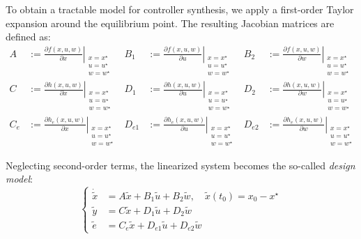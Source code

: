 \documentclass[]{report}
\begin{document}
	
	To obtain a tractable model for controller synthesis, we apply a first-order Taylor expansion around the equilibrium point. The resulting Jacobian matrices are defined as:
	\begin{equation}
		\label{eq:jacobians_compact_matrix}
		\begin{aligned}
			A &:= \left. \frac{\partial f(x, u, w)}{\partial x} \right|_{\substack{x = x^\star \\ u = u^\star \\ w = w^\star}} & B_1 &:= \left. \frac{\partial f(x, u, w)}{\partial u} \right|_{\substack{x = x^\star \\ u = u^\star \\ w = w^\star}} & B_2 &:= \left. \frac{\partial f(x, u, w)}{\partial w} \right|_{\substack{x = x^\star \\ u = u^\star \\ w = w^\star}} \\
			C &:= \left. \frac{\partial h(x, u, w)}{\partial x} \right|_{\substack{x = x^\star \\ u = u^\star \\ w = w^\star}} & D_1 &:= \left. \frac{\partial h(x, u, w)}{\partial u} \right|_{\substack{x = x^\star \\ u = u^\star \\ w = w^\star}} & D_2 &:= \left. \frac{\partial h(x, u, w)}{\partial w} \right|_{\substack{x = x^\star \\ u = u^\star \\ w = w^\star}} \\
			C_e &:= \left. \frac{\partial h_e(x, u, w)}{\partial x} \right|_{\substack{x = x^\star \\ u = u^\star \\ w = w^\star}} & D_{e1} &:= \left. \frac{\partial h_e(x, u, w)}{\partial u} \right|_{\substack{x = x^\star \\ u = u^\star \\ w = w^\star}} & D_{e2} &:= \left. \frac{\partial h_e(x, u, w)}{\partial w} \right|_{\substack{x = x^\star \\ u = u^\star \\ w = w^\star}}
		\end{aligned}
	\end{equation}
	
	
	
	
	
	Neglecting second-order terms, the linearized system becomes the so-called \textit{design model}:
	\begin{equation}
		\label{eq:linearized_system}
		\left\{
		\begin{aligned}
			\dot{\tilde{x}} &= A \tilde{x} + B_1 \tilde{u} + B_2 \tilde{w}, \quad \tilde{x}(t_0) = x_0 - x^\star \\
			\tilde{y} &= C \tilde{x} + D_1 \tilde{u} + D_2 \tilde{w} \\
			\tilde{e} &= C_e \tilde{x} + D_{e1} \tilde{u} + D_{e2} \tilde{w}
		\end{aligned}
		\right.
	\end{equation}
	
\end{document}
